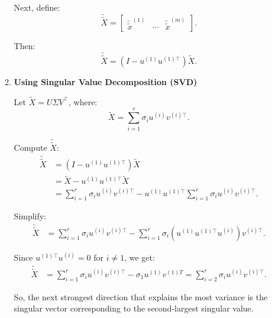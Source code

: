\begin{example}
\begin{enumerate}
\begin{enumerate}
            Next, define:
            \[
            \tilde{\tilde{X}} = 
            \begin{bmatrix}
            \tilde{\tilde{x}}^{(1)} & \cdots & \tilde{\tilde{x}}^{(m)}
            \end{bmatrix}.
            \]
    
            Then:
            \[
            \tilde{\tilde{X}} = \left(I - u^{(1)} u^{(1)\top} \right) \tilde{X}.
            \]
    
            \item \textbf{Using Singular Value Decomposition (SVD)}
    
            Let \(\tilde{X} = U \Sigma V^\top\), where:
            \[
            \tilde{X} = \sum_{i=1}^r \sigma_i u^{(i)} v^{(i)\top}.
            \]
    
            Compute \( \tilde{\tilde{X}} \):
            \begin{align*}
            \tilde{\tilde{X}} &= \left(I - u^{(1)} u^{(1)\top} \right) \tilde{X} \\
            &= \tilde{X} - u^{(1)} u^{(1)\top} \tilde{X} \\
            &= \sum_{i=1}^r \sigma_i u^{(i)} v^{(i)\top} - u^{(1)} u^{(1)\top} \sum_{i=1}^r \sigma_i u^{(i)} v^{(i)\top}.
            \end{align*}
    
            Simplify:
            \begin{align*}
            \tilde{\tilde{X}} &= \sum_{i=1}^r \sigma_i u^{(i)} v^{(i)\top} - \sum_{i=1}^r \sigma_i \left(u^{(1)} u^{(1)\top} u^{(i)} \right) v^{(i)\top}.
            \end{align*}
    
            Since \(u^{(1)\top} u^{(i)} = 0\) for \(i \neq 1\), we get:
            \begin{align*}
            \tilde{\tilde{X}} &= \sum_{i=1}^r \sigma_i u^{(i)} v^{(i)\top} - \sigma_1 u^{(1)} v^{(1)T} = \sum_{i=2}^r \sigma_i u^{(i)} v^{(i)\top} .
            \end{align*}
    
            
            So, the next strongest direction that explains the most variance is the singular vector corresponding to the second-largest singular value.
        \end{enumerate}
    \end{enumerate}
\end{example}